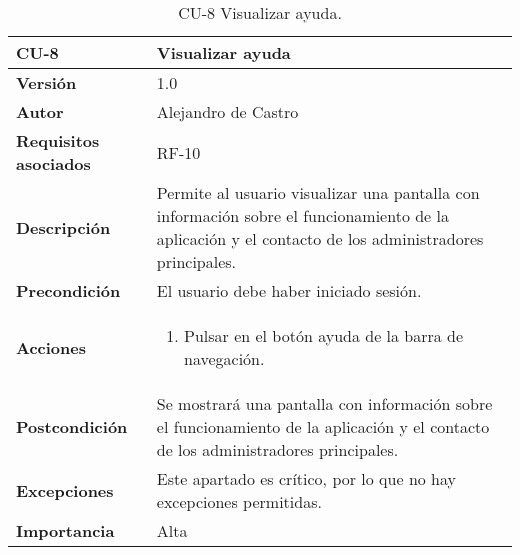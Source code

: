 \begin{table}[p]
	\centering
	\begin{tabularx}{\linewidth}{ p{} p{} }
		\toprule
		\textbf{CU-8}    & \textbf{Visualizar ayuda}\\
		\toprule
		\textbf{Versión}              & 1.0    \\
		\textbf{Autor}                & {Alejandro de Castro} \\
		\textbf{Requisitos asociados} & RF-10 \\
		\textbf{Descripción}          & Permite al usuario visualizar una pantalla con información sobre el funcionamiento de la aplicación y el contacto de los administradores principales. \\
		\textbf{Precondición}         & El usuario debe haber iniciado sesión. \\
        \textbf{Acciones}             &
		\begin{enumerate}
			\def\labelenumi{\arabic{enumi}.}
			\tightlist
			\item Pulsar en el botón ayuda de la barra de navegación.
		\end{enumerate}\\ 
		\textbf{Postcondición}        & Se mostrará una pantalla con información sobre el funcionamiento de la aplicación y el contacto de los administradores principales. \\
		\textbf{Excepciones}          & Este apartado es crítico, por lo que no hay excepciones permitidas. \\
		\textbf{Importancia}          & Alta \\
		\bottomrule
	\end{tabularx}
	\caption{CU-8 Visualizar ayuda.}
\end{table}

